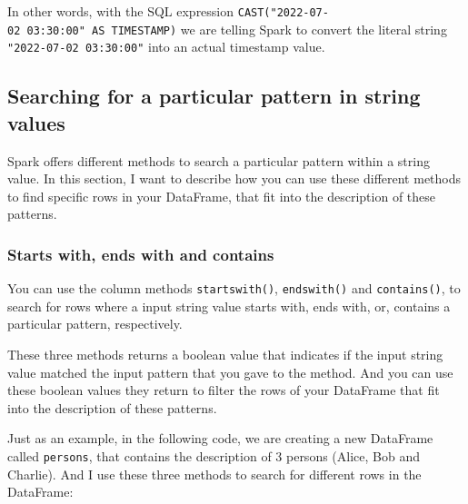 \documentclass[
  11pt,
  letterpaper,
  DIV=11,
  numbers=noendperiod]{scrreprt}
\begin{document}
In other words, with the SQL expression
\texttt{CAST("2022-07-02\ 03:30:00"\ AS\ TIMESTAMP)} we are telling
Spark to convert the literal string \texttt{"2022-07-02\ 03:30:00"} into
an actual timestamp value.

\hypertarget{sec-filter-pattern-search}{%
\subsection{Searching for a particular pattern in string
values}\label{sec-filter-pattern-search}}

Spark offers different methods to search a particular pattern within a
string value. In this section, I want to describe how you can use these
different methods to find specific rows in your DataFrame, that fit into
the description of these patterns.

\hypertarget{starts-with-ends-with-and-contains}{%
\subsubsection{Starts with, ends with and
contains}\label{starts-with-ends-with-and-contains}}

You can use the column methods \texttt{startswith()},
\texttt{endswith()} and \texttt{contains()}, to search for rows where a
input string value starts with, ends with, or, contains a particular
pattern, respectively.

These three methods returns a boolean value that indicates if the input
string value matched the input pattern that you gave to the method. And
you can use these boolean values they return to filter the rows of your
DataFrame that fit into the description of these patterns.

Just as an example, in the following code, we are creating a new
DataFrame called \texttt{persons}, that contains the description of 3
persons (Alice, Bob and Charlie). And I use these three methods to
search for different rows in the DataFrame:
\end{document}

